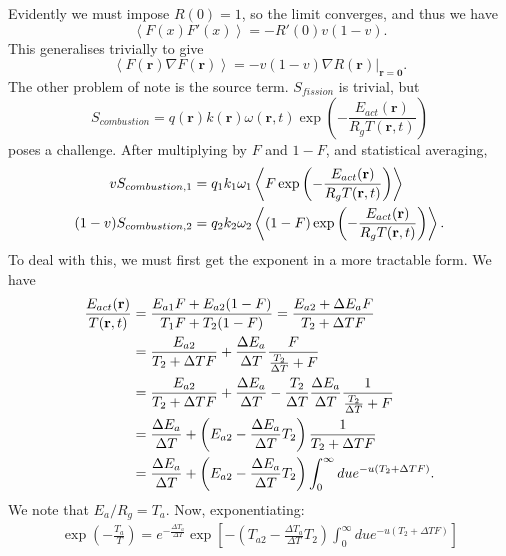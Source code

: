 \documentclass[12pt]{article}
\begin{document}
Evidently we must impose $R(0)=1$, so the limit converges, and thus we have 
\begin{equation}
    \left< F(x)F'(x)\right>=-R'(0)v(1-v).
\end{equation}
This generalises trivially to give 
\begin{equation}
    \left< F(\mathbf{r})\nabla F(\mathbf{r})\right>=-v(1-v) \nabla R(\mathbf{r}) \Bigr|_{\mathbf{r=0}}.
\end{equation}
The other problem of note is the source term. $S_{fission}$ is trivial, but 
\begin{equation}
S_{combustion}=q(\mathbf{r})k(\mathbf{r})\omega(\mathbf{r},t)\exp{\left(-\frac{E_{act}(\mathbf{r})}{R_g T(\mathbf{r},t)}\right)}
\end{equation}
poses a challenge. After multiplying by $F$ and $1-F$, and statistical averaging,
\begin{align}
    vS_{combustion,1}&=q_1 k_1 \omega_1 \left<F \exp{\left(-\frac{E_{act}(\mathbf{r})}{R_g T(\mathbf{r},t)}\right)}\right> \notag \\
    (1-v)S_{combustion,2}&=q_2 k_2 \omega_2 \left<(1-F) \exp{\left(-\frac{E_{act}(\mathbf{r})}{R_g T(\mathbf{r},t)}\right)}\right>.
      \end{align}
To deal with this, we must first get the exponent in a more tractable form. We have 
\begin{align}
    \frac{E_{act}(\mathbf{r})}{T(\mathbf{r},t)}&=\frac{E_{a1}F+E_{a2}(1-F)}{T_1F+T_2(1-F)} = \frac{E_{a2}+\Delta E_a F}{T_2+\Delta TF} \notag \\
    &=\frac{E_{a2}}{T_2+\Delta TF}+\frac{\Delta E_a}{\Delta T} \frac{F}{\frac{T_2}{\Delta T}+F} \notag \\
    &=\frac{E_{a2}}{T_2+\Delta TF} + \frac{\Delta E_a}{\Delta T}- \frac{T_2}{\Delta T} \frac{\Delta E_a}{\Delta T} \frac{1}{\frac{T_2}{\Delta T}+F} \notag \\
    &=\frac{\Delta E_a}{\Delta T}+\left( E_{a2}-\frac{\Delta E_a}{\Delta T}T_2\right) \frac{1}{T_2 + \Delta T F} \notag \\
    &=\frac{\Delta E_a}{\Delta T}+\left( E_{a2}-\frac{\Delta E_a}{\Delta T}T_2\right) \int _0 ^\infty du e^{-u(T_2+\Delta TF)}.
\end{align}
We note that $E_a/R_g=T_a$. Now, exponentiating: 
\begin{align}
    \exp \left(- \frac{T_a}{T}\right)=e^{-\frac{\Delta T_a}{\Delta T}}\exp{\left[ -\left(T_{a2}-\frac{\Delta T_a}{\Delta T}T_2 \right)\int_0 ^{\infty}due^{-u(T_2+\Delta TF)} \right]}
\end{align}
\end{document}
